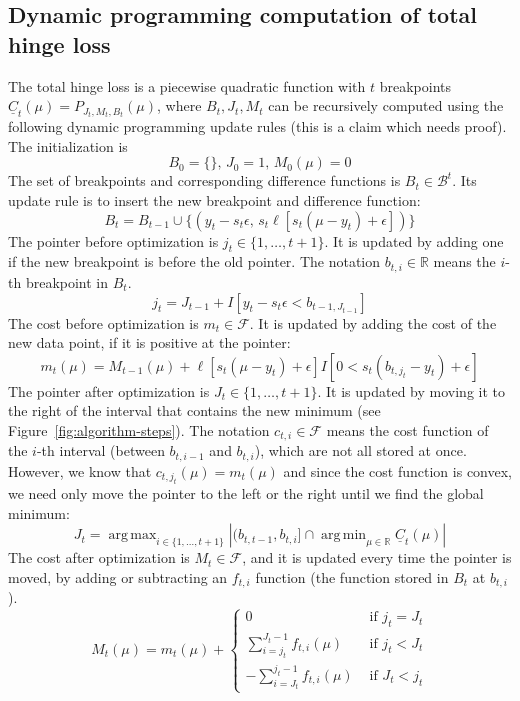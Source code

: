 \documentclass{article}
\DeclareMathOperator*{\argmin}{arg\,min}
\DeclareMathOperator*{\argmax}{arg\,max}
\begin{document}
\subsection{Dynamic programming computation of total hinge loss}
The total hinge loss is a piecewise quadratic function with $t$
breakpoints $\underline C_t(\mu)=P_{J_t,M_t,B_t}(\mu)$, where
$B_t,J_t,M_t$ can be recursively computed using the following dynamic
programming update rules (this is a claim which needs proof). The
initialization is
\begin{equation}
  \label{eq:init}
  B_0=\{\},\, J_0=1,\, M_0(\mu)=0
\end{equation}
The set of breakpoints and corresponding difference functions is
$B_t\in\mathcal B^t$. Its update rule is to insert the new breakpoint
and difference function:
\begin{equation}
  \label{eq:B_t}
  B_t=B_{t-1}\cup \{(y_t-s_t\epsilon,\, s_t\ell[s_t(\mu-y_t)+\epsilon])\}
\end{equation}
The pointer before optimization is $j_t\in\{1,\dots,t+1\}$. It is
updated by adding one if the new breakpoint is before the old
pointer. The notation $b_{t,i}\in\mathbb R$ means the $i$-th
breakpoint in $B_t$.
\begin{equation}
  \label{eq:j_t}
  j_t = J_{t-1} + I[y_t-s_t\epsilon < b_{t-1,J_{t-1}}]
\end{equation}
The cost before optimization is $m_t\in\mathcal F$. It is updated by adding the
cost of the new data point, if it is positive at the pointer:
\begin{equation}
  \label{eq:m_t}
  m_t(\mu) = M_{t-1}(\mu) + 
  \ell[s_t(\mu-y_t)+\epsilon]
  I[0<s_t(b_{t,j_t}-y_t)+\epsilon]
\end{equation}
The pointer after optimization is $J_t\in\{1,\dots,t+1\}$. It is
updated by moving it to the right of the interval that contains the
new minimum (see Figure~\ref{fig:algorithm-steps}). The notation
$c_{t,i}\in\mathcal F$ means the cost function of the $i$-th interval
(between $b_{t,i-1}$ and $b_{t,i}$), which are not all stored at
once. However, we know that $c_{t,j_t}(\mu)=m_t(\mu)$ and since the
cost function is convex, we need only move the pointer to the left or
the right until we find the global minimum:
\begin{equation}
  \label{eq:J_t}
  J_t = \argmax_{i\in\{1,\dots,t+1\}}
  |(b_{t,t-1}, b_{t,i}]\cap \argmin_{\mu\in\mathbb R}\underline C_t(\mu)|
\end{equation}
The cost after optimization is $M_t\in\mathcal F$, and it is updated every time
the pointer is moved, by adding or subtracting an $f_{t,i}$ function
(the function stored in $B_t$ at $b_{t,i}$).
\begin{equation}
  \label{eq:M_t}
  M_t(\mu)=m_t(\mu) +
  \begin{cases}
    0 & \text{ if } j_t = J_t\\
    \sum_{i=j_t}^{J_t-1} f_{t,i}(\mu) & \text{ if } j_t < J_t\\
    -\sum_{i=J_t}^{j_t-1} f_{t,i}(\mu) & \text{ if } J_t < j_t
  \end{cases}
\end{equation}
\end{document}
